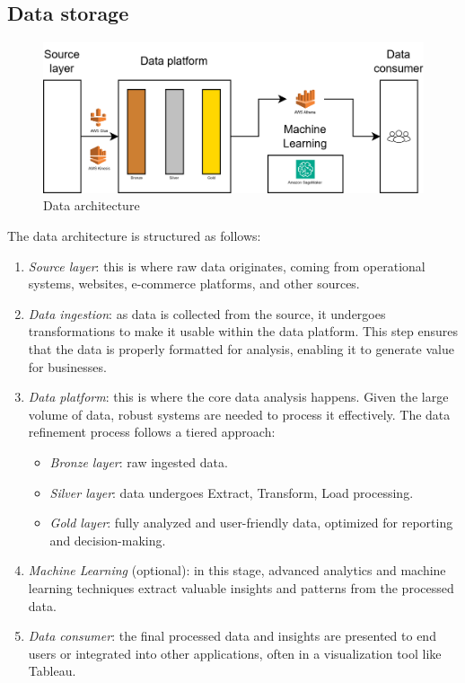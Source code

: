 \subsection{Data storage}
\begin{figure}[H]
    \centering
    \includegraphics[width=0.75\linewidth]{images/bis11.png}
    \caption{Data architecture}
\end{figure}
The data architecture is structured as follows:
\begin{enumerate}
    \item \textit{Source layer}: this is where raw data originates, coming from operational systems, websites, e-commerce platforms, and other sources.
    \item \textit{Data ingestion}: as data is collected from the source, it undergoes transformations to make it usable within the data platform. 
        This step ensures that the data is properly formatted for analysis, enabling it to generate value for businesses.
    \item \textit{Data platform}: this is where the core data analysis happens. 
        Given the large volume of data, robust systems are needed to process it effectively. 
        The data refinement process follows a tiered approach:
        \begin{itemize}
            \item \textit{Bronze layer}: raw ingested data.
            \item \textit{Silver layer}: data undergoes Extract, Transform, Load processing.
            \item \textit{Gold layer}: fully analyzed and user-friendly data, optimized for reporting and decision-making.
        \end{itemize}
    \item \textit{Machine Learning} (optional): in this stage, advanced analytics and machine learning techniques extract valuable insights and patterns from the processed data.
    \item \textit{Data consumer}: the final processed data and insights are presented to end users or integrated into other applications, often in a visualization tool like Tableau.
\end{enumerate}
